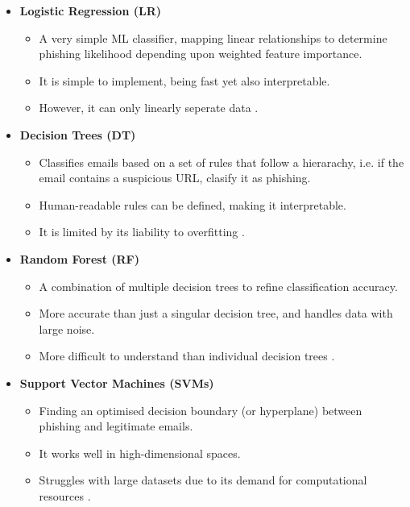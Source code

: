 \begin{itemize}
    \item \textbf{Logistic Regression (LR)}
    \begin{itemize}
      \item A very simple ML classifier, mapping linear relationships to determine phishing likelihood depending upon weighted feature importance.
        \item It is simple to implement, being fast yet also interpretable.
        \item However, it can only linearly seperate data \citep{almujahid2024comparative}.
    \end{itemize}
    \item \textbf{Decision Trees (DT)}
    \begin{itemize}
      \item Classifies emails based on a set of rules that follow a hierarachy, i.e. if the email contains a suspicious URL, clasify it as phishing.
        \item Human-readable rules can be defined, making it interpretable.
        \item It is limited by its liability to overfitting \citep{patil2015survey}.
    \end{itemize}
    \item \textbf{Random Forest (RF)}
    \begin{itemize}
      \item A combination of multiple decision trees to refine classification accuracy.
        \item More accurate than just a singular decision tree, and handles data with large noise.
        \item More difficult to understand than individual decision trees \citep{verma2015character}.
    \end{itemize}
    \item \textbf{Support Vector Machines (SVMs)}
    \begin{itemize}
        \item Finding an optimised decision boundary (or hyperplane) between phishing and legitimate emails.
        \item It works well in high-dimensional spaces.
        \item Struggles with large datasets due to its demand for computational resources \citep{islam2013multi}.
    \end{itemize}
\end{itemize}

